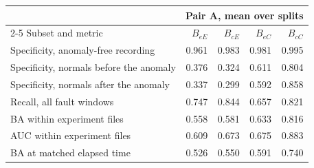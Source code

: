 \begin{tabular}{@{}l rrrr@{}}
\toprule
& \multicolumn{4}{c}{Pair A, mean over splits} \\
\cmidrule(l){2-5}
Subset and metric & $B_{eE}$ & $B_{cE}$ & $B_{eC}$ & $B_{cC}$ \\
\midrule
Specificity, anomaly-free recording & 0.961 & 0.983 & 0.981 & 0.995 \\
Specificity, normals before the anomaly & 0.376 & 0.324 & 0.611 & 0.804 \\
Specificity, normals after the anomaly & 0.337 & 0.299 & 0.592 & 0.858 \\
Recall, all fault windows & 0.747 & 0.844 & 0.657 & 0.821 \\
BA within experiment files & 0.558 & 0.581 & 0.633 & 0.816 \\
AUC within experiment files & 0.609 & 0.673 & 0.675 & 0.883 \\
BA at matched elapsed time & 0.526 & 0.550 & 0.591 & 0.740 \\
\bottomrule
\end{tabular}
\par\medskip
